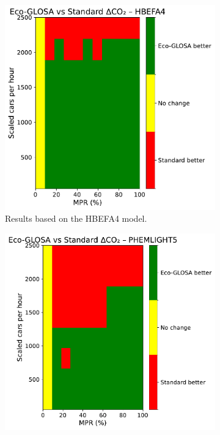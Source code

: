 \begin{figure}[htbp]
  \centering
  \begin{subfigure}[b]{0.65\textwidth}
    \includegraphics[width=\textwidth]{data/img/BreakEven/delta_CO2_HBEFA4.pdf}
    \caption{Results based on the HBEFA4 model.}
    \label{fig:BE_EcoStd_HBEFA4}
  \end{subfigure}
  \begin{subfigure}[b]{0.65\textwidth}
    \includegraphics[width=\textwidth]{data/img/BreakEven/delta_CO2_PHEMLIGHT5.pdf}

\end{subfigure}
\end{figure}
